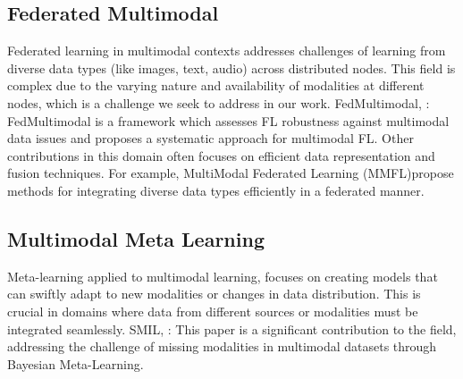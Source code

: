 \documentclass{article} %
\begin{document}
\subsection{Federated Multimodal}
Federated learning in multimodal contexts addresses challenges of learning from diverse data types (like images, text, audio) across distributed nodes. This field is complex due to the varying nature and availability of modalities at different nodes, which is a challenge we seek to address in our work. FedMultimodal, \cite{multifed}: FedMultimodal is a framework which assesses FL robustness against multimodal data issues and proposes a systematic approach for multimodal FL. Other contributions in this domain often focuses on efficient data representation and fusion techniques. For example, MultiModal Federated Learning \cite{multifed} (MMFL)propose methods for integrating diverse data types efficiently in a federated manner.

\subsection{Multimodal Meta Learning}
Meta-learning applied to multimodal learning, \cite{metamul} focuses on creating models that can swiftly adapt to new modalities or changes in data distribution. This is crucial in domains where data from different sources or modalities must be integrated seamlessly. SMIL, \cite{smil}: This paper is a significant contribution to the field, addressing the challenge of missing modalities in multimodal datasets through Bayesian Meta-Learning.


\end{document}

